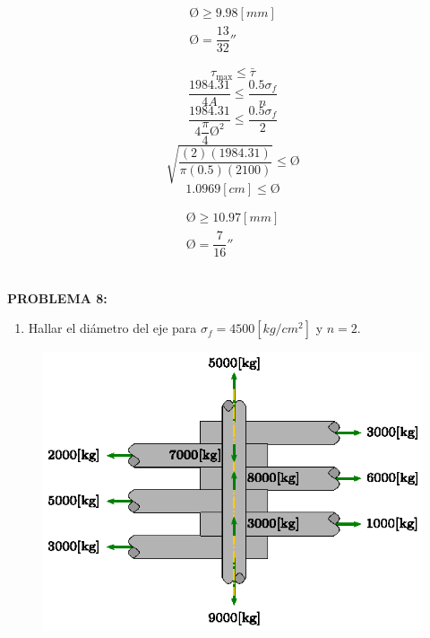 \documentclass[letter,10pt,twoside]{article}
\begin{document}
\begin{equation*}
\boxed{
    \begin{array}{l}
        \text{\O} \ge 9.98[mm] \\
        \text{\O} = \dfrac{13}{32}''
    \end{array}
}
\end{equation*}

\begin{equation*}
    \tau_{\text{max}} \le \bar{\tau}
\end{equation*}
\begin{equation*}
    \frac{1984.31}{4A} \le \frac{0.5 \sigma_f}{n}
\end{equation*}
\begin{equation*}
    \frac{1984.31}{4\dfrac{\pi}{4} \text{\O}^2} \le \frac{0.5 \sigma_f}{2}
\end{equation*}
\begin{equation*}
    \sqrt{\frac{(2)(1984.31)}{\pi(0.5)(2100)}} \le \text{\O}
\end{equation*}
\begin{equation*}
    1.0969[cm] \le \text{\O}
\end{equation*}

\begin{equation*}
\boxed{
    \boxed{
        \begin{array}{l}
            \text{\O} \ge 10.97[mm] \\
            \text{\O} = \dfrac{7}{16}''
        \end{array}
    }
}
\end{equation*}
\\

\newpage

\colorbox{blue!25}{\textbf{PROBLEMA 8:}}

\begin{enumerate}[label=\alph*)]
    \item Hallar el diámetro del eje para $\sigma_f = 4500[kg/cm^2]$ y $n = 2$.
\end{enumerate}

\begin{figure}[H]
\centering
\includegraphics[scale=1.35]{resources/f84.eps}
\end{figure}
\end{document}
